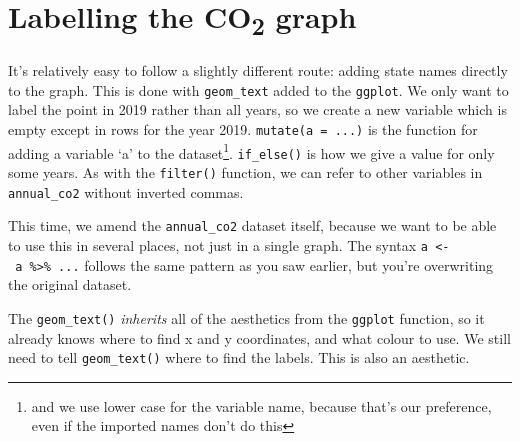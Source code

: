 \documentclass[
]{book}
\begin{document}
\hypertarget{labelco2}{%
\section{\texorpdfstring{Labelling the CO\textsubscript{2} graph}{Labelling the CO2 graph}}\label{labelco2}}

It's relatively easy to follow a slightly different route: adding state names directly to the graph. This is done with \texttt{geom\_text} added to the \texttt{ggplot}. We only want to label the point in 2019 rather than all years, so we create a new variable which is empty except in rows for the year 2019. \texttt{mutate(a\ =\ ...)} is the function for adding a variable `a' to the dataset\footnote{and we use lower case for the variable name, because that's our preference, even if the imported names don't do this}. \texttt{if\_else()} is how we give a value for only some years. As with the \texttt{filter()} function, we can refer to other variables in \texttt{annual\_co2} without inverted commas.

This time, we amend the \texttt{annual\_co2} dataset itself, because we want to be able to use this in several places, not just in a single graph. The syntax \texttt{a\ \textless{}-\ a\ \%\textgreater{}\%\ ...} follows the same pattern as you saw earlier, but you're overwriting the original dataset.

The \texttt{geom\_text()} \emph{inherits} all of the aesthetics from the \texttt{ggplot} function, so it already knows where to find x and y coordinates, and what colour to use. We still need to tell \texttt{geom\_text()} where to find the labels. This is also an aesthetic.
\end{document}

